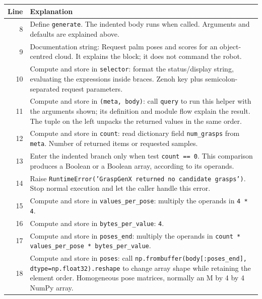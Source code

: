 \documentclass[11pt,a4paper]{book}
\begin{document}
\begin{longtable}{r p{}}

\textbf{Line} & \textbf{Explanation} \\ \hline \endhead

8 & Define \texttt{generate}. The indented body runs when called. Arguments and defaults are explained above. \\

9 & Documentation string: Request palm poses and scores for an object-centred cloud. It explains the block; it does not command the robot. \\

10 & Compute and store in \texttt{selector}: format the status/display string, evaluating the expressions inside braces. Zenoh key plus semicolon-separated request parameters. \\

11 & Compute and store in \texttt{(meta, body)}: call \texttt{query} to run this helper with the arguments shown; its definition and module flow explain the result. The tuple on the left unpacks the returned values in the same order. \\

12 & Compute and store in \texttt{count}: read dictionary field \texttt{num\_grasps} from \texttt{meta}. Number of returned items or requested samples. \\

13 & Enter the indented branch only when test \texttt{count == 0}. This comparison produces a Boolean or a Boolean array, according to its operands. \\

14 & Raise \texttt{RuntimeError('GraspGenX returned no candidate grasps')}. Stop normal execution and let the caller handle this error. \\

15 & Compute and store in \texttt{values\_per\_pose}: multiply the operands in \texttt{4 * 4}.  \\

16 & Compute and store in \texttt{bytes\_per\_value}: \texttt{4}.  \\

17 & Compute and store in \texttt{poses\_end}: multiply the operands in \texttt{count * values\_per\_pose * bytes\_per\_value}.  \\

18 & Compute and store in \texttt{poses}: call \texttt{np.frombuffer(body[:poses\_end], dtype=np.float32).reshape} to change array shape while retaining the element order. Homogeneous pose matrices, normally an M by 4 by 4 NumPy array. \\


\end{longtable}
\end{document}

